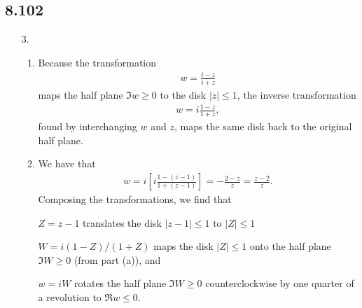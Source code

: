 \documentclass[a4paper,12pt]{article}
\begin{document}
\subsection*{8.102}
\begin{enumerate}
    \item[3.]
        \begin{enumerate}
            \item
                Because the transformation
                \begin{align*}
                    w = \frac{i - z}{i + z}
                \end{align*}
                maps the half plane $\Im w \geq 0$ to the disk $|z| \leq 1$, the inverse transformation
                \begin{align*}
                    w = i \frac{1 - z}{1 + z},
                \end{align*}
                found by interchanging $w$ and $z$, maps the same disk back to the original half plane.

            \item
                We have that
                \begin{align*}
                    w = i \left[ i \frac{1 - (z - 1)}{1 + (z - 1)} \right] = -\frac{2 - z}{z} = \frac{z - 2}{z}.
                \end{align*}
                Composing the transformations, we find that \par
                $Z = z - 1$ translates the disk $|z - 1| \leq 1$ to $|Z| \leq 1$ \par
                $W = i(1 - Z)/(1 + Z)$ maps the disk $|Z| \leq 1$ onto the half plane $\Im W \geq 0$ (from part (a)), and \par
                $w = iW$ rotates the half plane $\Im W \geq 0$ counterclockwise by one quarter of a revolution to $\Re w \leq 0$.
        \end{enumerate}
\end{enumerate}
\end{document}
